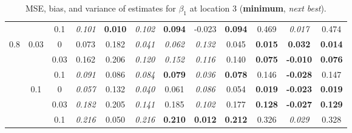 \documentclass[authoryear, review, 11pt]{elsarticle}
\begin{document}
\begin{table}[ht]
\begin{center}
\begin{tabular}{ccc | ccc | ccc | ccc }
		 &  & 0.1 &   \emph{0.101} & \textbf{0.010} & \emph{0.102} & \textbf{0.094} & -0.023 & \textbf{0.094} & 0.469 & \emph{0.017} & 0.474 \\ \cline{1-12}
		\multirow{6}{*}{0.8} & \multirow{3}{*}{0.03} & 0 &   0.073 & 0.182 & \emph{0.041} & \emph{0.062} & \emph{0.132} & 0.045 & \textbf{0.015} & \textbf{0.032} & \textbf{0.014} \\ 
		 &  & 0.03 &   0.162 & 0.206 & \emph{0.120} & \emph{0.152} & \emph{0.116} & 0.140 & \textbf{0.075} & \textbf{-0.010} & \textbf{0.076} \\ 
		 &  & 0.1 &   \emph{0.091} & 0.086 & \emph{0.084} & \textbf{0.079} & \emph{0.036} & \textbf{0.078} & 0.146 & \textbf{-0.028} & 0.147 \\ \cline{2-12}
		 & \multirow{3}{*}{0.1} & 0 &   \emph{0.057} & 0.132 & \emph{0.040} & 0.061 & \emph{0.086} & 0.054 & \textbf{0.019} & \textbf{-0.023} & \textbf{0.019} \\ 
		 &  & 0.03 &   \emph{0.182} & 0.205 & \emph{0.141} & 0.185 & \emph{0.102} & 0.177 & \textbf{0.128} & \textbf{-0.027} & \textbf{0.129} \\ 
		 &  & 0.1 &   \emph{0.216} & 0.050 & \emph{0.216} & \textbf{0.210} & \textbf{0.012} & \textbf{0.212} & 0.326 & \emph{0.029} & 0.328 \\ 
		  \end{tabular}
		\caption{MSE, bias, and variance of estimates for $\beta_1$ at location 3 (\textbf{minimum}, \emph{next best}).\label{table:loc3-estimation}}
		\end{center}
		\end{table}
		
		
		
\end{document}
